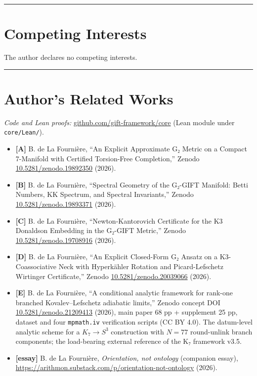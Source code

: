 \documentclass[11pt,a4paper]{article}
\begin{document}
\begin{center}\rule{\linewidth}{0.5pt}\end{center}

\section{Competing Interests}\label{competing-interests}

The author declares no competing interests.

\begin{center}\rule{\linewidth}{0.5pt}\end{center}

\section{Author's Related Works}\label{authors-related-works}

\emph{Code and Lean proofs:} \href{https://github.com/gift-framework/core}{github.com/gift-framework/core} (Lean module under \texttt{core/\allowbreak{}Lean/\allowbreak{}}).

\begin{itemize}
\tightlist
\item
  \textbf{{[}A{]}} B. de La Fournière, ``An Explicit Approximate G₂ Metric on a Compact 7-Manifold with Certified Torsion-Free Completion,'' Zenodo \href{https://doi.org/10.5281/zenodo.19892350}{10.5281/zenodo.19892350} (2026).
\item
  \textbf{{[}B{]}} B. de La Fournière, ``Spectral Geometry of the G₂-GIFT Manifold: Betti Numbers, KK Spectrum, and Spectral Invariants,'' Zenodo \href{https://doi.org/10.5281/zenodo.19893371}{10.5281/zenodo.19893371} (2026).
\item
  \textbf{{[}C{]}} B. de La Fournière, ``Newton-Kantorovich Certificate for the K3 Donaldson Embedding in the G₂-GIFT Metric,'' Zenodo \href{https://doi.org/10.5281/zenodo.19708916}{10.5281/zenodo.19708916} (2026).
\item
  \textbf{{[}D{]}} B. de La Fournière, ``An Explicit Closed-Form G₂ Ansatz on a K3-Coassociative Neck with Hyperkähler Rotation and Picard-Lefschetz Wirtinger Certificate,'' Zenodo \href{https://doi.org/10.5281/zenodo.20039066}{10.5281/zenodo.20039066} (2026).
\item
  \textbf{{[}E{]}} B. de La Fournière, ``A conditional analytic framework for rank-one branched Kovalev--Lefschetz adiabatic limits,'' Zenodo concept DOI \href{https://doi.org/10.5281/zenodo.21209413}{10.5281/zenodo.21209413} (2026), main paper 68 pp + supplement 25 pp, dataset and four \texttt{mpmath.\allowbreak{}iv} verification scripts (CC BY 4.0). The datum-level analytic scheme for a \(K_7 \to S^3\) construction with \(N = 77\) round-unlink branch components; the load-bearing external reference of the K₇ framework v3.5.
\item
  \textbf{{[}essay{]}} B. de La Fournière, \emph{Orientation, not ontology} (companion essay), \url{https://arithmon.substack.com/p/orientation-not-ontology} (2026).
\end{itemize}
\end{document}
